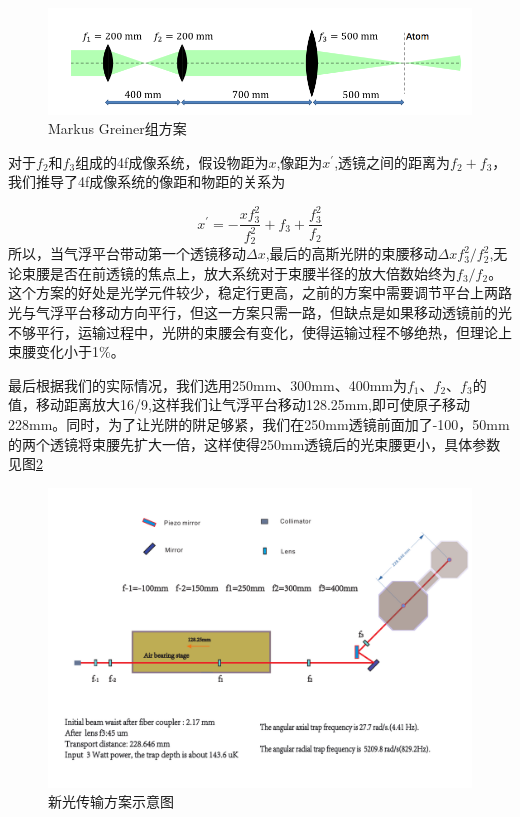 \documentclass[onecolumn,a4paper,10pt]{article}
\begin{document}
\begin{figure}[htbp]
\centering
\includegraphics[width=6in]{Markus}
\caption{Markus Greiner组方案}
\label{Markus}
\end{figure}

对于$f_{2}$和$f_{3}$组成的4f成像系统，假设物距为$x$,像距为$x^{'}$,透镜之间的距离为$f_{2}+f_{3}$，我们推导了4f成像系统的像距和物距的关系为

\begin{equation}
	x^{'}=-\frac{xf_{3}^{2}}{f_{2}^{2}}+f_{3}+\frac{f_{3}^{2}}{f_{2}}
\end{equation}
所以，当气浮平台带动第一个透镜移动$\Delta x$,最后的高斯光阱的束腰移动$\Delta x f_{3}^{2}/f_{2}^{2}$,无论束腰是否在前透镜的焦点上，放大系统对于束腰半径的放大倍数始终为$f_{3}/f_{2}$。这个方案的好处是光学元件较少，稳定行更高，之前的方案中需要调节平台上两路光与气浮平台移动方向平行，但这一方案只需一路，但缺点是如果移动透镜前的光不够平行，运输过程中，光阱的束腰会有变化，使得运输过程不够绝热，但理论上束腰变化小于1\%。

最后根据我们的实际情况，我们选用250mm、300mm、400mm为$f_{1}$、$f_{2}$、$f_{3}$的值，移动距离放大16/9,这样我们让气浮平台移动128.25mm,即可使原子移动228mm。同时，为了让光阱的阱足够紧，我们在250mm透镜前面加了-100，50mm的两个透镜将束腰先扩大一倍，这样使得250mm透镜后的光束腰更小，具体参数见图\ref{new}

\begin{figure}[htbp]
\centering
\includegraphics[width=5in]{opticaltransfernew}
\caption{新光传输方案示意图}
\label{new}
\end{figure}
\end{document}
